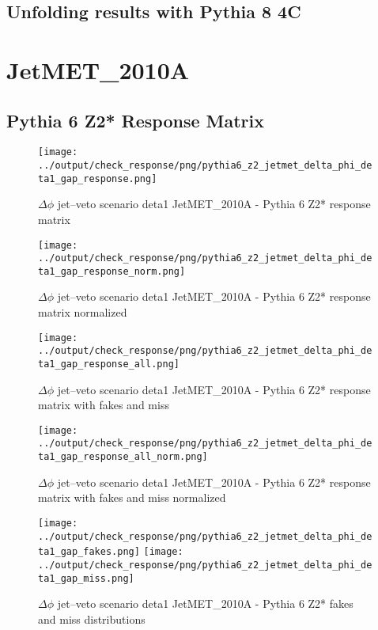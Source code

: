 \documentclass[11pt]{book}
\begin{document}
\clearpage
\subsection{Unfolding results with Pythia 8 4C}


\section{JetMET\_2010A}
\subsection{Pythia 6 Z2* Response Matrix}

\begin{figure}[ht]
\centering
\texttt{[image: ../output/check\_response/png/pythia6\_z2\_jetmet\_delta\_phi\_deta1\_gap\_response.png]}
\caption{$\Delta\phi$ jet--veto scenario deta1 JetMET\_2010A - Pythia 6 Z2* response matrix}
\label{p6_jetmet_delta_phi_deta1_gap_response}
\end{figure}

\begin{figure}[ht]
\centering
\texttt{[image: ../output/check\_response/png/pythia6\_z2\_jetmet\_delta\_phi\_deta1\_gap\_response\_norm.png]}
\caption{$\Delta\phi$ jet--veto scenario deta1 JetMET\_2010A - Pythia 6 Z2* response matrix normalized}
\label{p6_jetmet_delta_phi_deta1_gap_response_norm}
\end{figure}

\begin{figure}[ht]
\centering
\texttt{[image: ../output/check\_response/png/pythia6\_z2\_jetmet\_delta\_phi\_deta1\_gap\_response\_all.png]}
\caption{$\Delta\phi$ jet--veto scenario deta1 JetMET\_2010A - Pythia 6 Z2* response matrix with fakes and miss}
\label{p6_jetmet_delta_phi_deta1_gap_response_all}
\end{figure}

\begin{figure}[ht]
\centering
\texttt{[image: ../output/check\_response/png/pythia6\_z2\_jetmet\_delta\_phi\_deta1\_gap\_response\_all\_norm.png]}
\caption{$\Delta\phi$ jet--veto scenario deta1 JetMET\_2010A - Pythia 6 Z2* response matrix with fakes and miss normalized}
\label{p6_jetmet_delta_phi_deta1_gap_response_all_norm}
\end{figure}

\begin{figure}[ht]
\centering
\texttt{[image: ../output/check\_response/png/pythia6\_z2\_jetmet\_delta\_phi\_deta1\_gap\_fakes.png]}
\texttt{[image: ../output/check\_response/png/pythia6\_z2\_jetmet\_delta\_phi\_deta1\_gap\_miss.png]}
\caption{$\Delta\phi$ jet--veto scenario deta1 JetMET\_2010A - Pythia 6 Z2* fakes and miss distributions}
\label{p6_jetmet_delta_phi_deta1_gap_fakesmiss}
\end{figure}
\end{document}
